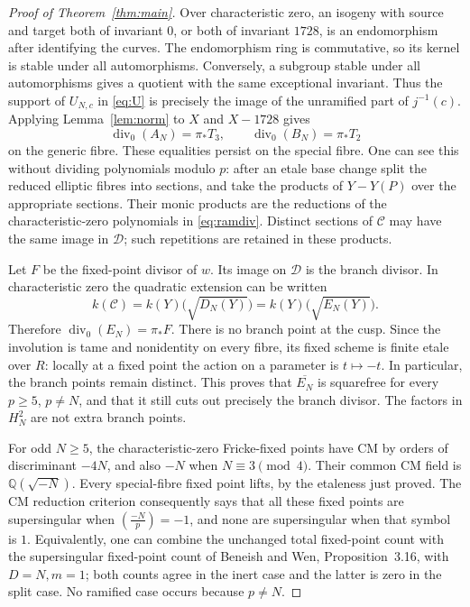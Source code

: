 \begin{proof}[Proof of Theorem~\ref{thm:main}]
Over characteristic zero, an isogeny with source and target both of invariant $0$, or both of invariant $1728$, is an endomorphism after identifying the curves. The endomorphism ring is commutative, so its kernel is stable under all automorphisms. Conversely, a subgroup stable under all automorphisms gives a quotient with the same exceptional invariant. Thus the support of $U_{N,c}$ in \eqref{eq:U} is precisely the image of the unramified part of $j^{-1}(c)$. Applying Lemma~\ref{lem:norm} to $X$ and $X-1728$ gives
\begin{equation}\label{eq:ramdiv}
 \operatorname{div}_0(A_N)=\pi_*T_3,\qquad
 \operatorname{div}_0(B_N)=\pi_*T_2
\end{equation}
on the generic fibre. These equalities persist on the special fibre. One can see this without dividing polynomials modulo $p$: after an etale base change split the reduced elliptic fibres into sections, and take the products of $Y-Y(P)$ over the appropriate sections. Their monic products are the reductions of the characteristic-zero polynomials in \eqref{eq:ramdiv}. Distinct sections of $\mathcal C$ may have the same image in $\mathcal D$; such repetitions are retained in these products.

Let $F$ be the fixed-point divisor of $w$. Its image on $\mathcal D$ is the branch divisor. In characteristic zero the quadratic extension can be written
\[
 k(\mathcal C)=k(Y)\bigl(\sqrt{D_N(Y)}\bigr)
             =k(Y)\bigl(\sqrt{E_N(Y)}\bigr).
\]
Therefore $\operatorname{div}_0(E_N)=\pi_*F$. There is no branch point at the cusp. Since the involution is tame and nonidentity on every fibre, its fixed scheme is finite etale over $R$: locally at a fixed point the action on a parameter is $t\mapsto-t$. In particular, the branch points remain distinct. This proves that $\overline{E_N}$ is squarefree for every $p\ge5$, $p\ne N$, and that it still cuts out precisely the branch divisor. The factors in $H_N^2$ are not extra branch points.

For odd $N\ge5$, the characteristic-zero Fricke-fixed points have CM by orders of discriminant $-4N$, and also $-N$ when $N\equiv3\pmod4$. Their common CM field is $\mathbb Q(\sqrt{-N})$. Every special-fibre fixed point lifts, by the etaleness just proved. The CM reduction criterion consequently says that all these fixed points are supersingular when $\left(\frac{-N}{p}\right)=-1$, and none are supersingular when that symbol is $1$. Equivalently, one can combine the unchanged total fixed-point count with the supersingular fixed-point count of Beneish and Wen, Proposition~3.16, with $D=N,m=1$; both counts agree in the inert case and the latter is zero in the split case. No ramified case occurs because $p\ne N$.


\end{proof}
